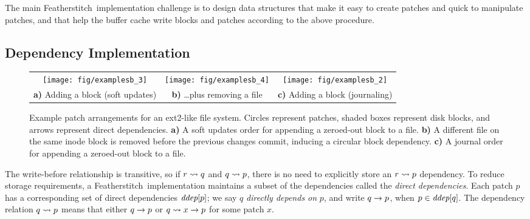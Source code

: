 \documentclass[9pt,twocolumn,letterpaper]{article}
\newcommand{\Kudos}{Featherstitch}
\newcommand{\Featherstitch}{\Kudos}
\newcommand{\patch}{patch}
\newcommand{\patches}{patches}
\begin{document}
The main \Featherstitch\ implementation challenge is to design
 data structures that make it easy to create patches and quick to manipulate
 patches, and that help the buffer cache write blocks and patches according
 to the above procedure.


\subsection{Dependency Implementation}



\begin{figure*}[t]
\centering
\begin{tabular}{@{}cc@{\qquad\qquad}c@{}}
\texttt{[image: fig/examplesb\_3]}
& \texttt{[image: fig/examplesb\_4]}
& \texttt{[image: fig/examplesb\_2]} \\
\textbf{a)} Adding a block (soft updates)
& \textbf{b)} \dots plus removing a file
& \textbf{c)} Adding a block (journaling) \\
\end{tabular}
\caption{Example patch arrangements for an ext2-like file system.
 Circles represent patches, shaded boxes represent disk blocks, and arrows
 represent direct dependencies.
 \textbf{a)} A soft updates order for appending a zeroed-out block to
 a file.  \textbf{b)} A different file on the same inode block is removed
 before the previous changes commit, inducing a circular block dependency.
 \textbf{c)} A journal order for appending a zeroed-out block to a
 file.}
\label{f:ex}
\end{figure*}


The write-before relationship is transitive, so if $r \leadsto q$ and $q
 \leadsto p$, there is no need to explicitly store an $r \leadsto p$
 dependency.
%
To reduce storage requirements, a \Kudos\ implementation maintains a
 subset of the dependencies called the \emph{direct dependencies}.
%
Each patch $p$ has a corresponding set of direct dependencies
 $\textit{ddep}[p]$; 
%
we say $q$ \emph{directly depends on} $p$, and write $q \rightarrow p$, when
 $p \in \textit{ddep}[q]$.
%
The dependency relation $q \leadsto p$ means that either $q
 \rightarrow p$ or $q \leadsto x \rightarrow p$ for some patch $x$.


\begin{comment}
\paragraph{Undo data}
%
When a \patch\ is created, the buffer cache's copy of the block data
is modified in-place to reflect the change. However,
%
some arrangements of \patches\ may require that the buffer cache
first write a block with only some \patches\ applied, and then write a
different block before being able to write the remaining \patches.
%
(An example of this is given in Section~\ref{sec:patch:examples}.)
\end{comment}
\end{document}
